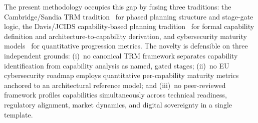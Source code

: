 The present methodology occupies this gap by fusing three traditions:
the Cambridge/Sandia TRM tradition~\cite{phaal2004,garcia1997} for
phased planning structure and stage-gate logic, the Davis/JCIDS
capability-based planning tradition~\cite{davis2002} for formal
capability definition and architecture-to-capability derivation, and
cybersecurity maturity models~\cite{nist_csf2,gcscc_cmm,doe_c2m2}
for quantitative progression metrics. The novelty is defensible on
three independent grounds: (i)~no canonical TRM framework separates
capability identification from capability analysis as named, gated
stages; (ii)~no EU cybersecurity roadmap employs quantitative
per-capability maturity metrics anchored to an architectural reference
model; and (iii)~no peer-reviewed framework profiles capabilities
simultaneously across technical readiness, regulatory alignment, market
dynamics, and digital sovereignty in a single template.


